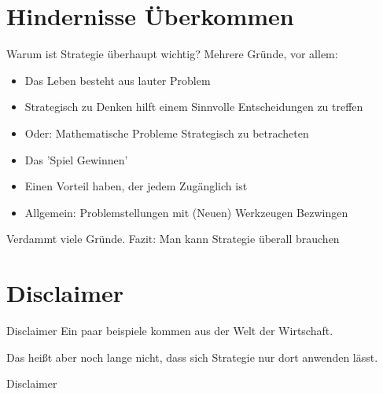 



\section{Hindernisse Überkommen}

\begin{frame}[c]{Warum ist Strategie überhaupt wichtig?}
    Mehrere Gründe, vor allem: \\
    \pause
    \begin{itemize}
        \item Das Leben besteht aus lauter Problem
            \pause
        \item Strategisch zu Denken hilft einem Sinnvolle Entscheidungen zu treffen
            \pause
        \item Oder: Mathematische Probleme Strategisch zu betracheten
            \pause
        \item Das 'Spiel Gewinnen'
            \pause
        \item Einen Vorteil haben, der jedem Zugänglich ist
            \pause
        \item Allgemein: Problemstellungen mit (Neuen) Werkzeugen Bezwingen
    \end{itemize}
    Verdammt viele Gründe.
    \newline
    \pause
    \LARGE
    Fazit: Man kann Strategie überall brauchen
\end{frame}


\section{Disclaimer}
\ifonline
\begin{frame}[c]{Disclaimer}
    Ein paar beispiele kommen aus der Welt der Wirtschaft. \\ \pause

    \vfill

    Das heißt aber noch lange nicht, dass sich Strategie nur dort anwenden lässt.
\end{frame}
\else
\begin{frame}[standout]
    Disclaimer
\end{frame}
\fi


